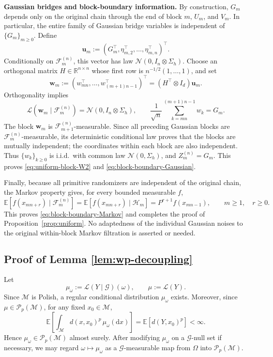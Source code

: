 \documentclass[11pt,letterpaper]{article}
\theoremstyle{plain}
\theoremstyle{definition}
\theoremstyle{remark}
\newcommand{\E}{\mathbb{E}}
\begin{document}
\noindent\textbf{Gaussian bridges and block-boundary information.}
By construction, \(G_m\) depends only on the original chain through the
end of block \(m\), \(U_m\), and \(V_m\). In particular, the entire
family of Gaussian bridge variables is independent of \(\{G_m\}_{m\geq0}\).
Define
\[
    \mathbf u_m:=(G_m^\top,\eta_{m,2}^\top,\ldots,
                  \eta_{m,n}^\top)^\top.
\]
Conditionally on \(\mathcal F_m^{(n)}\), this vector has law
\(\mathcal N(0,I_n\otimes\Sigma_h)\). Choose an orthogonal matrix
\(H\in\mathbb R^{n\times n}\) whose first row is
\(n^{-1/2}(1,\ldots,1)\), and set
\begin{equation}\label{eq:w-def}
    \mathbf w_m
    :=(w_{mn}^\top,\ldots,w_{(m+1)n-1}^\top)^\top
    =(H^\top\otimes I_d)\mathbf u_m.
\end{equation}
Orthogonality implies
\[
    \mathcal L(\mathbf w_m\mid\mathcal F_m^{(n)})
    =\mathcal N(0,I_n\otimes\Sigma_h),
    \qquad
    \frac1{\sqrt n}\sum_{k=mn}^{(m+1)n-1}w_k=G_m.
\]
The block \(\mathbf w_m\) is \(\mathcal F_{m+1}^{(n)}\)-measurable. Since
all preceding Gaussian blocks are \(\mathcal F_m^{(n)}\)-measurable,
its deterministic conditional law proves that the blocks are mutually
independent; the coordinates within each block are also independent.
Thus \(\{w_k\}_{k\geq0}\) is i.i.d.\ with common law
\(\mathcal N(0,\Sigma_h)\), and
\(Z_m^{(n)}=G_m\). This proves \eqref{eq:uniform-block-W2} and
\eqref{eq:block-boundary-Gaussian}.

Finally, because all primitive randomizers are independent of the original
chain, the Markov property gives, for every bounded measurable \(f\),
\[
    \E[f(x_{mn+r})\mid\mathcal F_m^{(n)}]
    =\E[f(x_{mn+r})\mid\mathcal H_m]
    =P^{r+1}f(x_{mn-1}),
    \qquad m\geq1,\quad r\geq0.
\]
This proves \eqref{eq:block-boundary-Markov} and completes the proof of
Proposition~\ref{prop:uniform}. No adaptedness of the individual Gaussian
noises to the original within-block Markov filtration is asserted or needed.

\subsection{Proof of Lemma \ref{lem:wp-decoupling}}\label{sec:proof-wp-decoupling}
Let
\[
    \mu_\omega
    :=
    \mathcal L(Y\mid\mathcal G)(\omega),
    \qquad
    \mu:=\mathcal L(Y).
\]
Since $\mathcal M$ is Polish, a regular conditional distribution
$\mu_\omega$ exists. Moreover, since $\mu\in\mathcal P_p(\mathcal M)$,
for any fixed $x_0\in\mathcal M$,
\[
    \E\left[
        \int_{\mathcal M}d(x,x_0)^p\,\mu_\omega(\mathrm dx)
    \right]
    =
    \E[d(Y,x_0)^p]
    <
    \infty.
\]
Hence $\mu_\omega\in\mathcal P_p(\mathcal M)$ almost surely. After
modifying $\mu_\omega$ on a $\mathcal G$-null set if necessary, we may
regard $\omega\mapsto\mu_\omega$ as a $\mathcal G$-measurable map from $\Omega$ into
$\mathcal P_p(\mathcal M)$.
\end{document}
